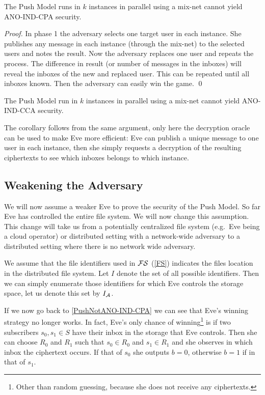 \begin{theorem}\label{PushNotANO-IND-CPA}
  The Push Model runs in \(k\) instances in parallel using a mix-net cannot 
  yield ANO-IND-CPA security.
\end{theorem}

\begin{proof}
  In phase 1 the adversary selects one target user in each instance.
  She publishes any message in each instance (through the mix-net) to the 
  selected users and notes the result.
  Now the adversary replaces one user and repeats the process.
  The difference in result (or number of messages in the inboxes) will reveal 
  the inboxes of the new and replaced user.
  This can be repeated until all inboxes known.
  Then the adversary can easily win the game.
  \qed{}
\end{proof}

\begin{corollary}
  The Push Model run in \(k\) instances in parallel using a mix-net cannot 
  yield ANO-IND-CCA security.
\end{corollary}

The corollary follows from the same argument, only here the decryption oracle 
can be used to make Eve more efficient:
Eve can publish a unique message to one user in each instance, then she simply 
requests a decryption of the resulting ciphertexts to see which inboxes belongs 
to which instance.

\subsection{Weakening the Adversary}

We will now assume a weaker Eve to prove the security of the Push Model.
So far Eve has controlled the entire file system.
We will now change this assumption.
This change will take us from a potentially centralized file system (e.g.\ Eve 
being a cloud operator) or distributed setting with a network-wide adversary to 
a distributed setting where there is no network wide adversary.

We assume that the file identifiers used in \(\FS\) (\cref{FS}) indicates the 
files location in the distributed file system.
Let \(I\) denote the set of all possible identifiers.
Then we can simply enumerate those identifiers for which Eve controls the 
storage space, let us denote this set by \(I_{\A}\).

If we now go back to \cref{PushNotANO-IND-CPA} we can see that Eve's winning 
strategy no longer works.
In fact, Eve's only chance of winning\footnote{Other than random guessing, 
  because she does not receive any ciphertexts.
} is if two subscribers \(s_0, s_1\in S\) have their inbox in the storage that 
Eve controls.
Then she can choose \(R_0\) and \(R_1\) such that \(s_0\in R_0\) and \(s_1\in 
  R_1\) and she observes in which inbox the ciphertext occurs.
If that of \(s_0\) she outputs \(b = 0\), otherwise \(b = 1\) if in that of 
\(s_1\).
